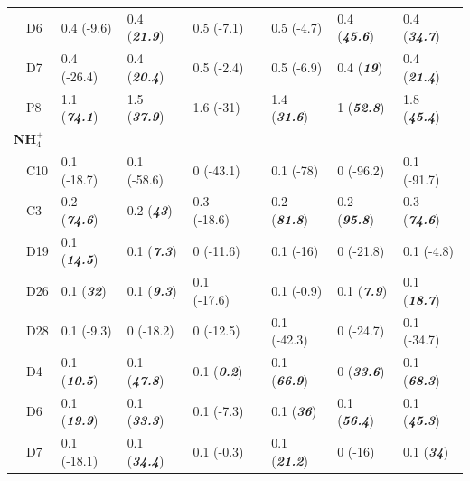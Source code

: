 \documentclass[letterpaper,12pt,oneside]{article}\usepackage[]{graphicx}\usepackage[]{color}
\begin{document}
\begin{table}[!tbp]
\begin{center}
\begin{tabular}{llllclll}
~~D6&0.4 \footnotesize{(-9.6)}&0.4 \footnotesize{(\textit{\textbf{21.9}})}&0.5 \footnotesize{(-7.1)}&&0.5 \footnotesize{(-4.7)}&0.4 \footnotesize{(\textit{\textbf{45.6}})}&0.4 \footnotesize{(\textit{\textbf{34.7}})}\tabularnewline
~~D7&0.4 \footnotesize{(-26.4)}&0.4 \footnotesize{(\textit{\textbf{20.4}})}&0.5 \footnotesize{(-2.4)}&&0.5 \footnotesize{(-6.9)}&0.4 \footnotesize{(\textit{\textbf{19}})}&0.4 \footnotesize{(\textit{\textbf{21.4}})}\tabularnewline
~~P8&1.1 \footnotesize{(\textit{\textbf{74.1}})}&1.5 \footnotesize{(\textit{\textbf{37.9}})}&1.6 \footnotesize{(-31)}&&1.4 \footnotesize{(\textit{\textbf{31.6}})}&1 \footnotesize{(\textit{\textbf{52.8}})}&1.8 \footnotesize{(\textit{\textbf{45.4}})}\tabularnewline
\hline
{\bfseries NH$_{4}^{+}$}&&&&&&&\tabularnewline
~~C10&0.1 \footnotesize{(-18.7)}&0.1 \footnotesize{(-58.6)}&0 \footnotesize{(-43.1)}&&0.1 \footnotesize{(-78)}&0 \footnotesize{(-96.2)}&0.1 \footnotesize{(-91.7)}\tabularnewline
~~C3&0.2 \footnotesize{(\textit{\textbf{74.6}})}&0.2 \footnotesize{(\textit{\textbf{43}})}&0.3 \footnotesize{(-18.6)}&&0.2 \footnotesize{(\textit{\textbf{81.8}})}&0.2 \footnotesize{(\textit{\textbf{95.8}})}&0.3 \footnotesize{(\textit{\textbf{74.6}})}\tabularnewline
~~D19&0.1 \footnotesize{(\textit{\textbf{14.5}})}&0.1 \footnotesize{(\textit{\textbf{7.3}})}&0 \footnotesize{(-11.6)}&&0.1 \footnotesize{(-16)}&0 \footnotesize{(-21.8)}&0.1 \footnotesize{(-4.8)}\tabularnewline
~~D26&0.1 \footnotesize{(\textit{\textbf{32}})}&0.1 \footnotesize{(\textit{\textbf{9.3}})}&0.1 \footnotesize{(-17.6)}&&0.1 \footnotesize{(-0.9)}&0.1 \footnotesize{(\textit{\textbf{7.9}})}&0.1 \footnotesize{(\textit{\textbf{18.7}})}\tabularnewline
~~D28&0.1 \footnotesize{(-9.3)}&0 \footnotesize{(-18.2)}&0 \footnotesize{(-12.5)}&&0.1 \footnotesize{(-42.3)}&0 \footnotesize{(-24.7)}&0.1 \footnotesize{(-34.7)}\tabularnewline
~~D4&0.1 \footnotesize{(\textit{\textbf{10.5}})}&0.1 \footnotesize{(\textit{\textbf{47.8}})}&0.1 \footnotesize{(\textit{\textbf{0.2}})}&&0.1 \footnotesize{(\textit{\textbf{66.9}})}&0 \footnotesize{(\textit{\textbf{33.6}})}&0.1 \footnotesize{(\textit{\textbf{68.3}})}\tabularnewline
~~D6&0.1 \footnotesize{(\textit{\textbf{19.9}})}&0.1 \footnotesize{(\textit{\textbf{33.3}})}&0.1 \footnotesize{(-7.3)}&&0.1 \footnotesize{(\textit{\textbf{36}})}&0.1 \footnotesize{(\textit{\textbf{56.4}})}&0.1 \footnotesize{(\textit{\textbf{45.3}})}\tabularnewline
~~D7&0.1 \footnotesize{(-18.1)}&0.1 \footnotesize{(\textit{\textbf{34.4}})}&0.1 \footnotesize{(-0.3)}&&0.1 \footnotesize{(\textit{\textbf{21.2}})}&0 \footnotesize{(-16)}&0.1 \footnotesize{(\textit{\textbf{34}})}\tabularnewline

\end{tabular}
\end{center}
\end{table}
\end{document}
